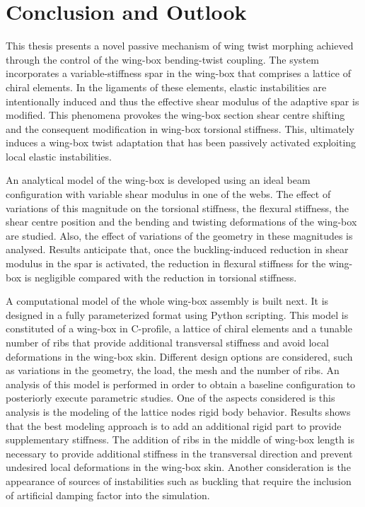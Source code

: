 \chapter{Conclusion and Outlook} \label{chap:summary}
%
%

This thesis presents a novel passive mechanism of wing twist morphing achieved through the control of the wing-box bending-twist coupling. The system incorporates a variable-stiffness spar in the wing-box that comprises a lattice of chiral elements. In the ligaments of these elements, elastic instabilities are intentionally induced and thus the effective shear modulus of the adaptive spar is modified. This phenomena provokes the wing-box section shear centre shifting and the consequent modification in wing-box torsional stiffness. This, ultimately induces a wing-box twist adaptation that has been passively activated exploiting local elastic instabilities.

An analytical model of the wing-box is developed using an ideal beam configuration with variable shear modulus in one of the webs. The effect of variations of this magnitude on the torsional stiffness, the flexural stiffness, the shear centre position and the bending and twisting deformations of the wing-box are studied. Also, the effect of variations of the geometry in these magnitudes is analysed. Results anticipate that, once the buckling-induced reduction in shear modulus in the spar is activated, the reduction in flexural stiffness for the wing-box is negligible compared with the reduction in torsional stiffness. 

A computational model of the whole wing-box assembly is built next. It is designed in a fully parameterized format using Python scripting. This model is constituted of a wing-box in C-profile, a lattice of chiral elements and a tunable number of ribs that provide additional transversal stiffness and avoid local deformations in the wing-box skin. Different design options are considered, such as variations in the geometry, the load, the mesh and the number of ribs. An analysis of this model is performed in order to obtain a baseline configuration to posteriorly execute parametric studies. One of the aspects considered is this analysis is the modeling of the lattice nodes rigid body behavior. Results shows that the best modeling approach is to add an additional rigid part to provide supplementary stiffness. The addition of ribs in the middle of wing-box length is necessary to provide additional stiffness in the transversal direction and prevent undesired local deformations in the wing-box skin. Another consideration is the appearance of sources of instabilities such as buckling that require the inclusion of artificial damping factor into the simulation. 

